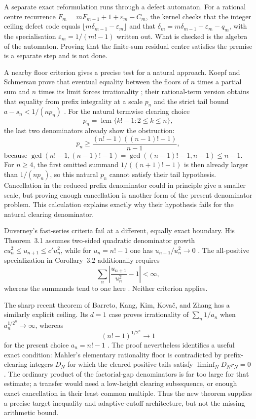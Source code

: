 \documentclass[11pt]{article}
\begin{document}
A separate exact reformulation runs through a defect automaton.  For a rational
centre recurrence $F_m=mF_{m-1}+1+\varepsilon_m-C_m$, the kernel checks that the
integer ceiling defect code equals $\lfloor m\delta_{m-1}-\varepsilon_m\rfloor$
and that $\delta_m=m\delta_{m-1}-\varepsilon_m-q_m$, with the specialisation
$\varepsilon_m=1/(m!-1)$ written out.  What is checked is the algebra of the
automaton.  Proving that the finite-sum residual centre satisfies the premise is
a separate step and is not done.

A nearby floor criterion gives a precise test for a natural approach.  Koepf
and Schmersau prove that eventual equality between the
floors of $n$ times a partial sum and $n$ times its limit forces irrationality
\cite[Theorem~1.1, p.~117]{koepf-schmersau}; their rational-term version obtains
that equality from prefix integrality at a scale $p_n$ and the strict tail
bound $a-s_n<1/(np_n)$
\cite[Theorems~2.2--2.3, pp.~119--120]{koepf-schmersau}.  For the natural
termwise clearing choice
\[
  p_n=\operatorname{lcm}\{k!-1:2\le k\le n\},
\]
the last two denominators already show the obstruction:
\[
  p_n\ge
  \frac{(n!-1)((n-1)!-1)}{n-1},
\]
because
$\gcd(n!-1,(n-1)!-1)=\gcd((n-1)!-1,n-1)\le n-1$.
For $n\ge4$, the first omitted summand $1/((n+1)!-1)$ is then already larger
than $1/(np_n)$, so this natural $p_n$ cannot satisfy their tail hypothesis.
Cancellation in the reduced prefix denominator could in principle give a
smaller scale, but proving enough cancellation is another form of the present
denominator problem.  This calculation explains exactly why their hypothesis
fails for the natural clearing denominator.

Duverney's fast-series criteria fail at a different, equally exact boundary.
His Theorem~3.1 assumes two-sided quadratic denominator growth
$cu_n^2\le u_{n+1}\le c'u_n^2$, while for $u_n=n!-1$ one has
$u_{n+1}/u_n^2\to0$ \cite[pp.~275, 285--286]{duverney}.
The all-positive specialization in Corollary~3.2 additionally requires
\[
  \sum_n\left|\frac{u_{n+1}}{u_n^2}-1\right|<\infty,
\]
whereas the summands tend to one here
\cite[Corollary~3.2, p.~287]{duverney}.  Neither criterion applies.

The sharp recent theorem of Barreto, Kang, Kim, Kova\v{c}, and Zhang has a
similarly explicit ceiling.  Its $d=1$ case proves irrationality of
$\sum_n1/a_n$ when $a_n^{1/2^n}\to\infty$, whereas
\[
  (n!-1)^{1/2^n}\longrightarrow1
\]
for the present choice $a_n=n!-1$
\cite[Theorems~2--3, pp.~2--4]{barreto-et-al}.  The proof nevertheless
identifies a useful exact condition: Mahler's elementary rationality floor is
contradicted by prefix-clearing integers $D_N$ for which the cleared positive
tails satisfy $\liminf_ND_Nr_N=0$
\cite[Lemma~8 and Proposition~12, pp.~6, 9--12]{barreto-et-al}.  The ordinary
product of the factorial-gap denominators is far too large for that estimate;
a transfer would need a low-height clearing subsequence, or enough exact
cancellation in their least common multiple.  Thus the new theorem supplies a
precise target inequality and adaptive-cutoff architecture, but not the
missing arithmetic bound.
\end{document}
